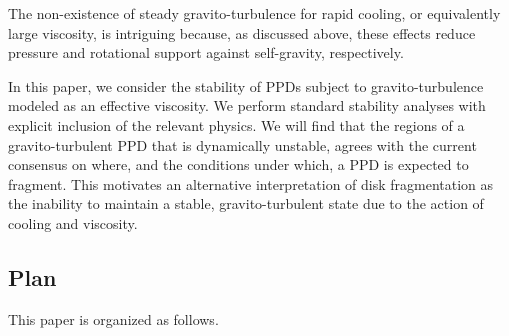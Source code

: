 \documentclass[iop, numberedappendix]{emulateapj}
\begin{document}
The non-existence of steady gravito-turbulence for rapid cooling, or
equivalently large viscosity, is intriguing because, as discussed
above, these effects reduce pressure and rotational support 
against self-gravity, respectively. 

In this paper, we consider the stability of PPDs subject to 
gravito-turbulence modeled as an effective viscosity. 
We perform standard stability analyses with explicit inclusion of the
relevant physics. 
We will find that the
regions of a gravito-turbulent PPD that is dynamically unstable,
agrees with the current consensus on where, and the conditions under
which, a PPD is expected to fragment. This motivates an alternative 
interpretation of disk fragmentation as the inability to maintain a
stable, gravito-turbulent state due to the action of cooling and
viscosity.  














\subsection{Plan}

This paper is organized as follows. 








 


\appendix




\end{document}
